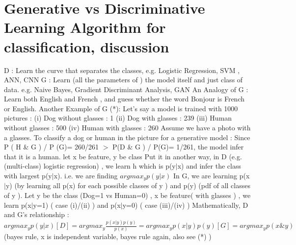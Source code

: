 \documentclass{article}
\begin{document}
\section{Generative vs Discriminative Learning Algorithm for classification, discussion} 
D : Learn the curve that separates the classes, e.g. Logistic Regression, SVM , ANN, CNN \newline
G : Learn (all the parameters of ) the model itself and just class of data. e.g. Naive Bayes, Gradient Discriminant Analysis, GAN\newline
An Analogy of G : Learn both English and French , and guess whether the word Bonjour is French or English. \newline
Another Example of G (*): \newline
Let's say a model is trained with 1000 pictures :\newline 
(i) Dog without glasses : 1 \newline
(ii) Dog with glasses : 239 \newline
(iii) Human without glasses : 500 \newline
(iv) Human with glasses : 260 \newline
Assume we have a photo with a glasses. To classify a dog or human in the picture for a generative model : Since P ( H \& G ) / P (G)= 260/261 \(>\) P(D \& G ) / P(G)= 1/261, the model infer that it is a human.\newline
let x be feature, y be class\newline
Put it in another way, in D  (e.g. (multi-class) logistic regression) , we learn h which is p(y\(|\)x) and infer the class with largest p(y\(|\)x). i.e. we are finding \(argmax_{y} p(y|x)\)\newline
In G, we are learning p(x\(|\)y) (by learning all p(x) for each possible classes of y  ) and p(y) (pdf of all classes of y ). Let y be the class (Dog=1 vs Human=0) , x be feature( with glasses ) , we learn p(x\(|\)y=1) ( case (i)/(ii) )  and p(x\(|\)y=0) ( case (iii)/(iv) )\newline 
Mathematically, D and G's relationship :  \(argmax_{y} p(y|x) [D] = argmax_{y} \frac{p(x|y)p(y)}{p(x)} = argmax_{y} p(x|y)p(y) [G] = argmax_{y} p(x \& y) \)\newline
(bayes rule, x is independent variable, bayes rule again, also see (*) )\newline
\end{document}
